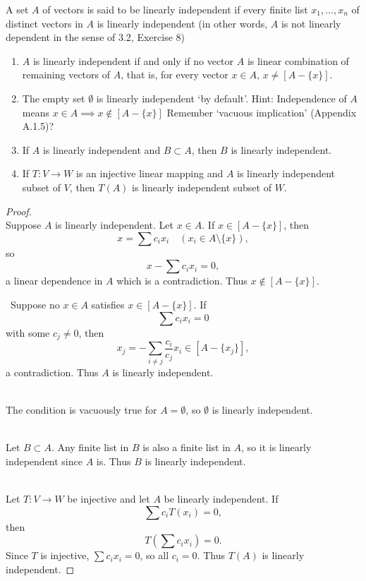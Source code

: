 \begin{tcolorbox}[title=Problem 15, breakable]
    A set $A$ of vectors is said to be linearly independent
    if every finite list $x_1, \ldots, x_n$ of distinct 
    vectors in $A$ is linearly independent (in other words,
    $A$ is not linearly dependent in the sense of 3.2, Exercise 8)
    \begin{enumerate}
        \item $A$ is linearly independent if and only if no vector $A$ is 
        linear combination of remaining vectors of $A$, that is, for every 
        vector $x \in A$, $x \ne [A - \{x\}]$.
        \item The empty set $\emptyset$ is linearly independent `by default'.
        {Hint: Independence of $A$ means $x \in A \implies x \notin [A - \{x\}]$
        Remember `vacuous implication' (Appendix A.1.5)?}
        \item If $A$ is linearly independent and $B \subset A$, then $B$ is linearly independent.
        \item If $T : V \longrightarrow W$ is an injective linear mapping and $A$
        is linearly independent subset of $V$, then $T(A)$ is linearly independent subset of $W$.
    \end{enumerate}
\end{tcolorbox}

\begin{proof}
     \\
    \underbar{($\longrightarrow$)}
    Suppose $A$ is linearly independent. Let $x \in A$. If $x \in [A - \{x\}]$, then
    \[
        x = \sum c_i x_i \quad (x_i \in A \setminus \{x\}),
    \]
    so
    \[
        x - \sum c_i x_i = 0,
    \]
    a linear dependence in $A$ which is a contradiction. Thus $x \notin [A - \{x\}]$.

    \underbar{\textbf{($\longleftarrow$)}}\
    Suppose no $x \in A$ satisfies $x \in [A - \{x\}]$. If
    \[
        \sum c_i x_i = 0
    \]
    with some $c_j \ne 0$, then
    \[
        x_j = -\sum_{i \ne j} \frac{c_i}{c_j} x_i \in [A - \{x_j\}],
    \]
    a contradiction. Thus $A$ is linearly independent.

    \medskip
     \\
    The condition is vacuously true for $A = \emptyset$, so $\emptyset$ is linearly independent.

    \medskip
     \\
    Let $B \subset A$. Any finite list in $B$ is also a finite list in $A$, 
        so it is linearly independent since $A$ is. Thus $B$ is linearly independent.

    \medskip
    \\
    Let $T: V \to W$ be injective and let $A$ be linearly independent. If
    \[
    \sum c_i T(x_i) = 0,
    \]
    then
    \[
    T\left(\sum c_i x_i\right) = 0.
    \]
    Since $T$ is injective, $\sum c_i x_i = 0$, so all $c_i = 0$. 
    Thus $T(A)$ is linearly independent.
\end{proof}


